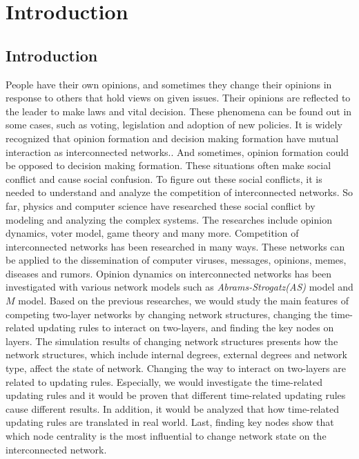 
\chapter{Introduction}
\label{chap:intro}
\section{Introduction}
People have their own opinions, and sometimes they change their opinions in response to others that hold views on given issues. Their opinions are reflected to the leader to make laws and vital decision. These phenomena can be found out  in some cases, such as voting, legislation and adoption of new policies. It is widely recognized that opinion formation and decision making formation have mutual interaction as interconnected networks.\parencite{mikko2014, danziger2019, newman2010, boccaletti2014, domenico2013, tomasini2015, namkhanhvu2017}. And sometimes, opinion formation could be opposed to decision making formation. These situations often make social conflict and cause social confusion. To figure out these social conflicts, it is needed to understand and analyze the competition of interconnected networks. So far, physics and computer science have researched these social conflict by modeling and analyzing the complex systems\parencite{fangwu2004, zuev2012, laguna2004, masuda2014}. The researches include opinion dynamics, voter model, game theory and many more.\parencite{smyrnakis2019, bianconi2018, redner2017, haibo2017, amato2017, quattrociocchi2014, casey2009} 
Competition of interconnected networks has been researched in many ways. These networks can be applied to the dissemination of computer viruses, messages, opinions, memes, diseases and rumors\parencite{hua2014,shenyu2018, zhou2018, alvarez2016,gomez2015,diep2017,rocca2014,velasquez2018}. Opinion dynamics on interconnected networks has been investigated with various network models such as \textit{Abrams-Strogatz(AS)} model\parencite{abrams2003,vazquez2010} and $M$ model\parencite{rocca2014}.  Based on the previous researches, we would study the main features of competing two-layer networks by changing network structures, changing the time-related updating rules to interact on two-layers, and finding the key nodes on layers. The simulation results of changing network structures presents how the network structures, which include internal degrees, external degrees and network type, affect the state of network. Changing the way to interact on two-layers are related to updating rules. Especially, we would investigate the time-related updating rules and it would be proven that different time-related updating rules cause different results. In addition, it would be analyzed that how time-related updating rules are translated in real world. Last, finding key nodes show that which node centrality is the most influential to change network state on the interconnected network. 
